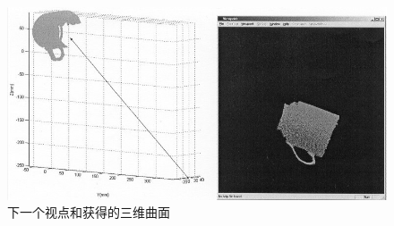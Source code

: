 \documentclass[AutoFakeBold,zihao=-4]{ctexart}
\begin{document}
	\begin{figure}[H]
		\centering
		\includegraphics[scale=0.3]{PIC17}
		\caption{下一个视点和获得的三维曲面}
		\label{fig-17}
	\end{figure}
\end{document}
